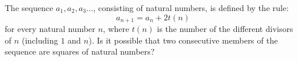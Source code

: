 The sequence $a_1,a_2,a_3\ldots $, consisting of natural numbers, is defined by the rule:
\[a_{n+1}=a_{n}+2t(n)\]
for every natural number $n$, where $t(n)$ is the number of the different divisors of $n$ (including $1$ and $n$). Is it possible that two consecutive members of the sequence are squares of natural numbers?